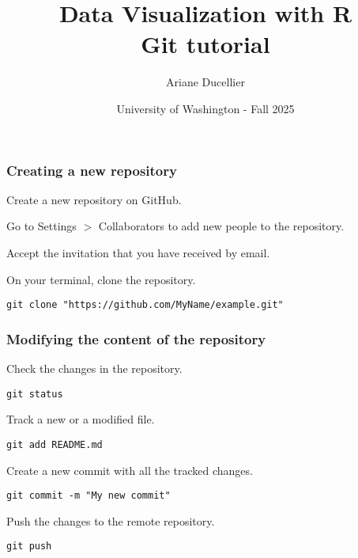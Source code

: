 \documentclass{beamer}
\title[Data Visualization with R - Git tutorial]{Data Visualization with R \\ Git tutorial}
\author{Ariane Ducellier}
\date{University of Washington - Fall 2025}
\begin{document}
	\begin{frame}
		\titlepage
	\end{frame}

	\begin{frame}[fragile]
		\frametitle{Creating a new repository}

		Create a new repository on GitHub.

		\vspace{1em}
		
		Go to Settings $>$ Collaborators to add new people to the repository.

		\vspace{1em}

		Accept the invitation that you have received by email.

		\vspace{1em}

		On your terminal, clone the repository.

		\begin{exampleblock}{}
		\begin{BVerbatim}
git clone "https://github.com/MyName/example.git"
		\end{BVerbatim}
		\end{exampleblock}{}
	\end{frame}

	\begin{frame}[fragile]
		\frametitle{Modifying the content of the repository}

		Check the changes in the repository.

		\begin{exampleblock}{}
		\begin{BVerbatim}
git status
		\end{BVerbatim}
		\end{exampleblock}{}
	
		Track a new or a modified file.

		\begin{exampleblock}{}
		\begin{BVerbatim}
git add README.md
		\end{BVerbatim}
		\end{exampleblock}{}

		Create a new commit with all the tracked changes.

		\begin{exampleblock}{}
		\begin{BVerbatim}
git commit -m "My new commit"
		\end{BVerbatim}
		\end{exampleblock}{}

		Push the changes  to the remote repository.

		\begin{exampleblock}{}
		\begin{BVerbatim}
git push
		\end{BVerbatim}
		\end{exampleblock}{}
	\end{frame}
\end{document}

